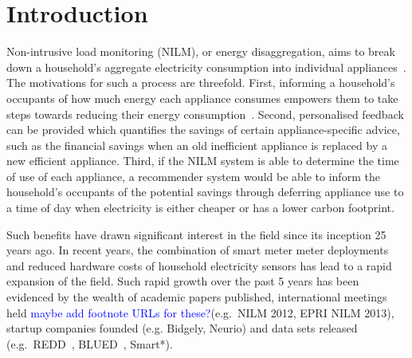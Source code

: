 \documentclass{sig-alternate}
\newcommand{\bluecolor}[1]{\textcolor{blue}{#1}}
\begin{document}
\section{Introduction}

\noindent
Non-intrusive load monitoring (NILM), or energy disaggregation, aims to break down a household's aggregate electricity consumption into individual appliances~\cite{hart_1992}. The motivations for such a process are threefold. First, informing a household's occupants of how much energy each appliance consumes empowers them to take steps towards reducing their energy consumption~\cite{darby_2006}. Second, personalised feedback can be provided which quantifies the savings of certain appliance-specific advice, such as the financial savings when an old inefficient appliance is replaced by a new efficient appliance. Third, if the NILM system is able to determine the time of use of each appliance, a recommender system would be able to inform the household's occupants of the potential savings through deferring appliance use to a time of day when electricity is either cheaper or has a lower carbon footprint. %

Such benefits have drawn significant interest in the field since its inception 25 years ago. In recent years, the combination of smart meter meter deployments~\cite{CaliforniaPublicUtilitiesCommission2006,DepartmentofEnergy&ClimateChange2013} and reduced hardware costs of household electricity sensors has lead to a rapid expansion of the field. Such rapid growth over the past 5 years has been evidenced by the wealth of academic papers published, international meetings held \bluecolor{maybe add footnote URLs for these?}(e.g.\ NILM 2012, EPRI NILM 2013), startup companies founded (e.g. Bidgely, Neurio) and data sets released (e.g.\ REDD~\cite{redd}, BLUED~\cite{blued}, Smart*\cite{smart}).
\end{document}
